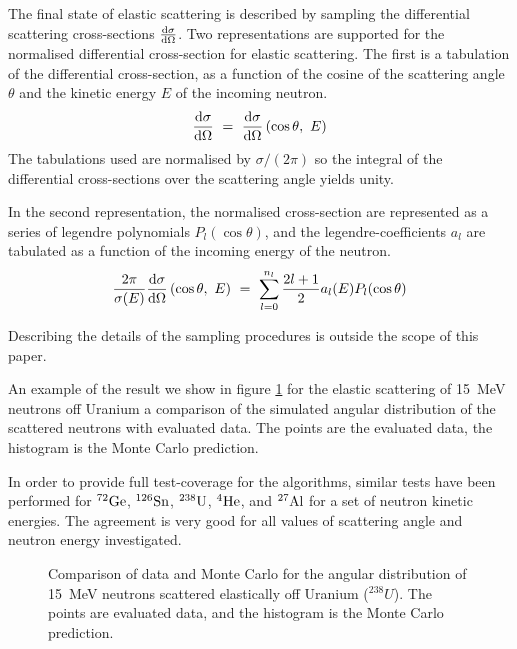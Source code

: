 The final state of elastic scattering is described by sampling the differential
scattering cross-sections
${{\rm d} \sigma \over {\rm d} \Omega}$. 
Two representations
are supported
for the normalised differential cross-section for 
elastic scattering.
The first is a tabulation of the differential cross-section, 
 as a 
function of the cosine of the scattering angle $\theta$ and the kinetic energy
$E$ of the incoming
neutron.
$${{\rm d} \sigma \over {\rm d} \Omega}~=~
{{\rm d} \sigma \over {\rm d} \Omega}\left(\cos{\theta,~E}\right)$$
The tabulations used are normalised by $\sigma/(2\pi)$ so the integral of the
differential cross-sections over the scattering angle yields unity.

In the second representation, the normalised cross-section are represented
as a series of legendre polynomials $P_l(\cos{\theta})$, and the 
legendre-coefficients $a_l$ are
tabulated as a function of the incoming energy of the neutron.
$${2\pi\over\sigma (E)}{{\rm d} \sigma \over {\rm d} \Omega}\left(\cos{\theta,~E}\right)~=~
\sum_{l=0}^{n_l} {2l+1\over 2}a_l(E)P_l(\cos{\theta})$$

Describing the details of the sampling procedures is outside the scope
of this paper.

An example of the result we show in figure \ref{elastic} for the elastic
scattering of 15~MeV neutrons off Uranium
a comparison of the simulated angular distribution of the scattered neutrons
with evaluated data.
The points are the evaluated data,
the histogram is the Monte Carlo prediction. 

In order to provide full
test-coverage for the algorithms, similar tests have been performed for 
${\rm^{72}Ge}$, 
${\rm^{126}Sn}$, 
${\rm^{238}U}$, 
${\rm^{4}He}$, and
${\rm^{27}Al}$ for a set of neutron kinetic energies.
The agreement is very good for all values of scattering angle and neutron 
energy investigated.
\begin{figure}[b!] %
\centerline{}
\vspace{10pt}
\caption{Comparison of data and Monte Carlo for the angular distribution of 
15~MeV neutrons scattered
elastically off Uranium ($^{238}U$). The points are evaluated data, and the histogram is
the Monte Carlo prediction.}
\label{elastic}
\end{figure}
